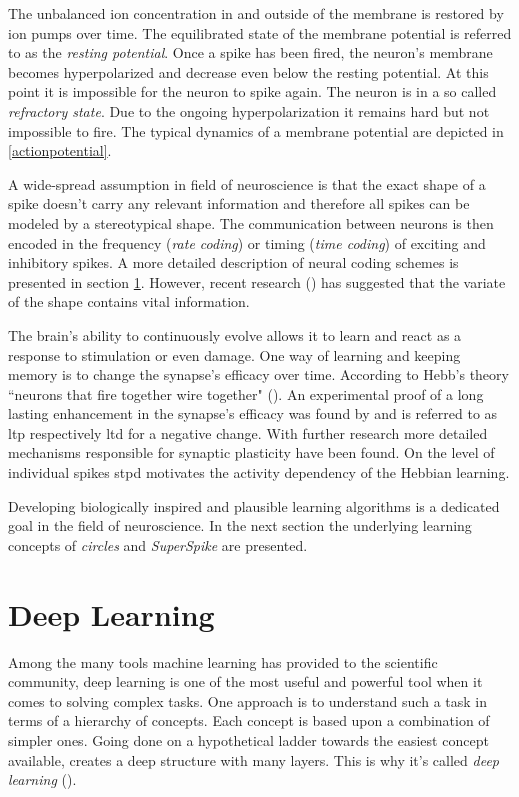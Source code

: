 The unbalanced ion concentration in and outside of the membrane is restored by ion pumps over time. The equilibrated state of the membrane potential is referred to as the \emph{resting potential}. Once a spike has been fired, the neuron's membrane becomes hyperpolarized and decrease even below the resting potential. At this point it is impossible for the neuron to spike again. The neuron is in a so called \emph{refractory state}. Due to the ongoing hyperpolarization it remains hard but not impossible to fire. The typical dynamics of a membrane potential are depicted in \cref{actionpotential}.

A wide-spread assumption in field of neuroscience is that the exact shape of a spike doesn't carry any relevant information and therefore all spikes can be modeled by a stereotypical shape. The communication between neurons is then encoded in the frequency (\emph{rate coding}) or timing (\emph{time coding}) of exciting and inhibitory spikes. A more detailed description of neural coding schemes is presented in section \ref{deeplearning}. However, recent research (\cite{debanne2013mechanisms}) has suggested that the variate of the shape contains vital information.

The brain's ability to continuously evolve allows it to learn and react as a response to stimulation or even damage. One way of learning and keeping memory is to change the synapse's efficacy over time. According to Hebb's theory ``neurons that fire together wire together" (\cite{hebb1949organization}). An experimental proof of a long lasting enhancement in the synapse's efficacy was found by \cite{bliss1973long} and is referred to as \gls{ltp} respectively \gls{ltd} for a negative change. With further research more detailed mechanisms responsible for synaptic plasticity have been found. On the level of individual spikes \gls{stpd} motivates the activity dependency of the Hebbian learning.

Developing biologically inspired and plausible learning algorithms is a dedicated goal in the field of neuroscience. In the next section the underlying learning concepts of \emph{circles} and \emph{SuperSpike} are presented.

\section{Deep Learning}
\label{deeplearning}
Among the many tools machine learning has provided to the scientific community, deep learning is one of the most useful and powerful tool when it comes to solving complex tasks. One approach is to understand such a task in terms of a hierarchy of concepts. Each concept is based upon a combination of simpler ones. Going done on a hypothetical ladder towards the easiest concept available, creates a deep structure with many layers. This is why it's called \textit{deep learning} (\cite{Goodfellow-et-al-2016}).

